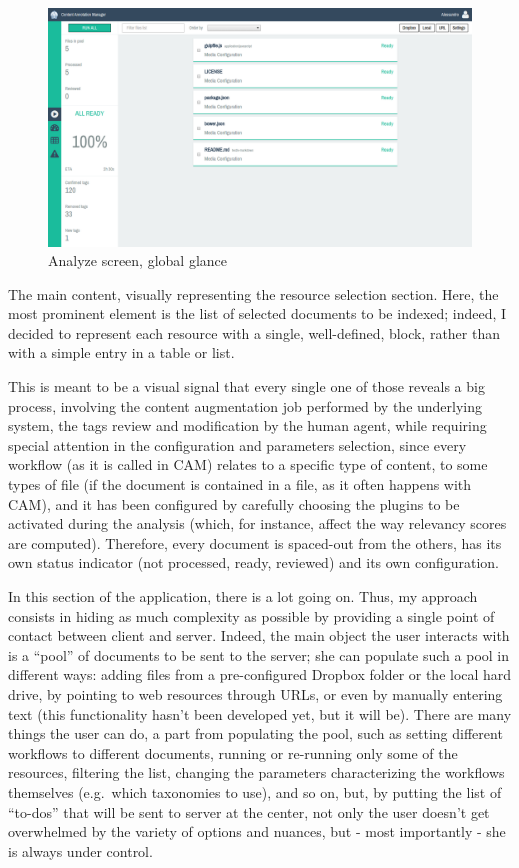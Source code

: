 \documentclass[12pt,svgnames]{memoir}
\begin{document}
\begin{figure}[htbp]
\centering
\includegraphics{./src/img/analyze-screen.png}
\caption{Analyze screen, global glance}
\end{figure}

The main content, visually representing the resource selection section.
Here, the most prominent element is the list of selected documents to be
indexed; indeed, I decided to represent each resource with a single,
well-defined, block, rather than with a simple entry in a table or list.

This is meant to be a visual signal that every single one of those
reveals a big process, involving the content augmentation job performed
by the underlying system, the tags review and modification by the human
agent, while requiring special attention in the configuration and
parameters selection, since every workflow (as it is called in CAM)
relates to a specific type of content, to some types of file (if the
document is contained in a file, as it often happens with CAM), and it
has been configured by carefully choosing the plugins to be activated
during the analysis (which, for instance, affect the way relevancy
scores are computed). Therefore, every document is spaced-out from the
others, has its own status indicator (not processed, ready, reviewed)
and its own configuration.

In this section of the application, there is a lot going on. Thus, my
approach consists in hiding as much complexity as possible by providing
a single point of contact between client and server. Indeed, the main
object the user interacts with is a ``pool'' of documents to be sent to
the server; she can populate such a pool in different ways: adding files
from a pre-configured Dropbox folder or the local hard drive, by
pointing to web resources through URLs, or even by manually entering
text (this functionality hasn't been developed yet, but it will be).
There are many things the user can do, a part from populating the pool,
such as setting different workflows to different documents, running or
re-running only some of the resources, filtering the list, changing the
parameters characterizing the workflows themselves (e.g.~which
taxonomies to use), and so on, but, by putting the list of ``to-dos''
that will be sent to server at the center, not only the user doesn't get
overwhelmed by the variety of options and nuances, but - most
importantly - she is always under control.
\end{document}
